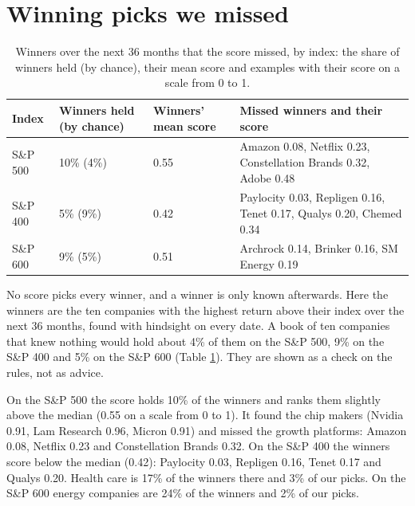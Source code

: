 \documentclass[11pt,a4paper]{article}
\begin{document}
\section{Winning picks we missed}
\label{sec:missed}
\begin{table}[H]
\centering
\small
\caption{Winners over the next 36 months that the score missed, by index: the share of winners held (by chance), their mean score and examples with their score on a scale from 0 to 1.}\label{tab:missed}
\begin{tabular}{l l l p{5.9cm}}
\hline
Index & Winners held (by chance) & Winners' mean score & Missed winners and their score \\
\hline
S\&P 500 & 10\% (4\%) & 0.55 & Amazon 0.08, Netflix 0.23, Constellation Brands 0.32, Adobe 0.48 \\
S\&P 400 & 5\% (9\%) & 0.42 & Paylocity 0.03, Repligen 0.16, Tenet 0.17, Qualys 0.20, Chemed 0.34 \\
S\&P 600 & 9\% (5\%) & 0.51 & Archrock 0.14, Brinker 0.16, SM Energy 0.19 \\
\hline
\end{tabular}
\end{table}
No score picks every winner, and a winner is only known afterwards. Here the winners are the ten companies with the highest return above their index over the next 36 months, found with hindsight on every date. A book of ten companies that knew nothing would hold about 4\% of them on the S\&P 500, 9\% on the S\&P 400 and 5\% on the S\&P 600 (Table \ref{tab:missed}). They are shown as a check on the rules, not as advice.

On the S\&P 500 the score holds 10\% of the winners and ranks them slightly above the median (0.55 on a scale from 0 to 1). It found the chip makers (Nvidia 0.91, Lam Research 0.96, Micron 0.91) and missed the growth platforms: Amazon 0.08, Netflix 0.23 and Constellation Brands 0.32. On the S\&P 400 the winners score below the median (0.42): Paylocity 0.03, Repligen 0.16, Tenet 0.17 and Qualys 0.20. Health care is 17\% of the winners there and 3\% of our picks. On the S\&P 600 energy companies are 24\% of the winners and 2\% of our picks.
\end{document}
